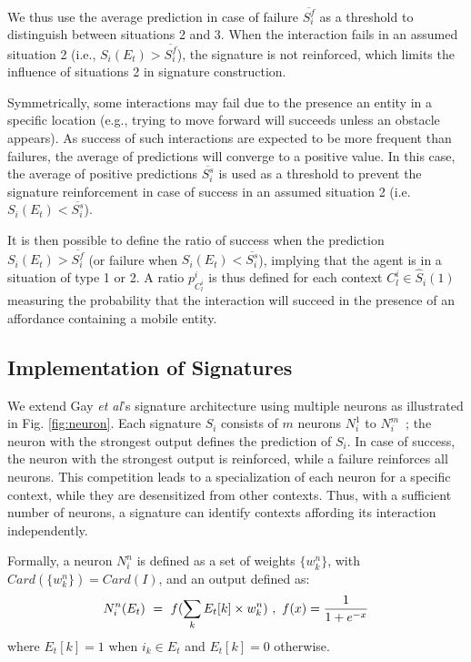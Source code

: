 \documentclass[conference]{IEEEtran}
\makeatletter
\let\cite\relax
\DeclareRobustCommand{\cite}{%
	\let\new@cite@pre\@gobble
	\@ifnextchar[\new@cite{\@citex[]}}
\def\new@cite[#1]{\@ifnextchar[{\new@citea{#1}}{\@citex[#1]}}
\def\new@citea#1{\def\new@cite@pre{#1}\@citex}
\makeatother
\begin{document}
We thus use the average prediction in case of failure $\overline{S_i^f}$ as a threshold to distinguish between situations 2 and 3.
When the interaction fails in an assumed situation 2 (i.e., $S_i(E_t)>\overline{S_i^f}$), the signature is not reinforced, which limits the influence of situations 2 in signature construction. 


Symmetrically, some interactions may fail due to the presence an entity in a specific location (e.g., trying to move forward will succeeds unless an obstacle appears).
As success of such interactions are expected to be more frequent than failures, the average of predictions will converge to a positive value.
In this case, the average of positive predictions $\overline{S_i^s}$ is used as a threshold to prevent the signature reinforcement in case of success in an assumed situation 2 (i.e. $S_i(E_t)<\overline{S_i^s}$).


It is then possible to define the ratio of success when the prediction $S_i(E_t)>\overline{S_i^f}$ (or failure when $S_i(E_t)<\overline{S_i^s}$), implying that the agent is in a situation of type 1 or 2. A ratio $p_{C_l^i}^i$ is thus defined for each context $C_l^i \in \hat{S}_i(1)$ measuring the probability that the interaction will succeed in the presence of an affordance containing a mobile entity.



\subsection{Implementation of Signatures}\label{contexts}


We extend Gay \textit{et al}'s signature architecture \cite{gay:space} using multiple neurons as illustrated in Fig. \ref{fig:neuron}. 
Each signature $S_i$ consists of $m$ neurons $N_i^1$ to $N_i^m$~; the neuron with the strongest output defines the prediction of $S_i$. 
In case of success, the neuron with the strongest output is reinforced, while a failure reinforces all neurons. 
This competition leads to a specialization of each neuron for a specific context, while they are desensitized from other contexts. Thus, with a sufficient number of neurons, a signature can identify contexts affording its interaction independently.

Formally, a neuron $N_i^n$ is defined as a set of weights $\{w_k^n\}$, with $Card(\{w_k^n\})=Card(I)$, and an output defined as:
\begin{equation}
N_i^n(E_t)~=~f(\sum_{k} E_t[k] \times w_k^n)~,~ f(x) = { {1}\over{1+e^{-x} }}
\end{equation}
where $E_t[k]=1$ when $i_k \in E_t$ and $E_t[k]=0$ otherwise.
\end{document}

